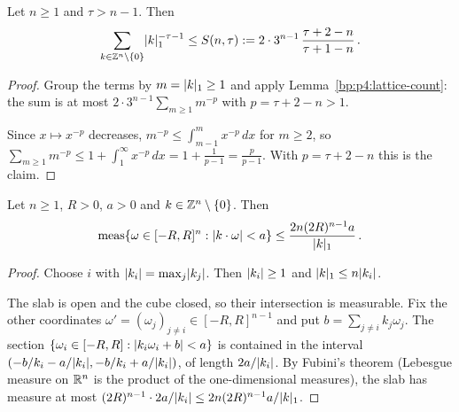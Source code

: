 \begin{lemma}\label{bp:p4:lattice-sum}
Let $n\ge1$ and $\tau>n-1$. Then
\begin{equation*}
\sum_{k\in\mathbb{Z}^n\setminus\{0\}}\lvert k\rvert_1^{-\tau-1}\le S(n,\tau):=2\cdot3^{n-1}\,\frac{\tau+2-n}{\tau+1-n}\,.
\end{equation*}
\end{lemma}

\begin{proof}
\label{step:p4:latsum-shells}
Group the terms by $m=\lvert k\rvert_1\ge1$ and apply Lemma~\ref{bp:p4:lattice-count}: the sum is at
most $2\cdot3^{n-1}\sum_{m\ge1}m^{-p}$ with $p=\tau+2-n>1$.

\label{step:p4:latsum-integral}
Since $x\mapsto x^{-p}$ decreases, $m^{-p}\le\int_{m-1}^mx^{-p}\,dx$ for $m\ge2$, so
$\sum_{m\ge1}m^{-p}\le1+\int_1^\infty x^{-p}\,dx=1+\frac1{p-1}=\frac{p}{p-1}$. With
$p=\tau+2-n$ this is the claim.
\end{proof}

\begin{lemma}\label{bp:p4:slab}
Let $n\ge1$, $R>0$, $a>0$ and $k\in\mathbb{Z}^n\setminus\{0\}$. Then
\begin{equation*}
\operatorname{meas}\{\omega\in[-R,R]^n:\lvert k\cdot\omega\rvert<a\}\le\frac{2n(2R)^{n-1}a}{\lvert k\rvert_1}\,.
\end{equation*}
\end{lemma}

\begin{proof}
\label{step:p4:slab-coordinate}
Choose $i$ with $\lvert k_i\rvert=\max_j\lvert k_j\rvert$. Then $\lvert k_i\rvert\ge1$ and $\lvert k\rvert_1\le n\lvert k_i\rvert$.

\label{step:p4:slab-fubini}
The slab is open and the cube closed, so their intersection is measurable. Fix the other coordinates
$\omega'=(\omega_j)_{j\ne i}\in[-R,R]^{n-1}$ and put $b=\sum_{j\ne i}k_j\omega_j$. The section
$\{\omega_i\in[-R,R]:\lvert k_i\omega_i+b\rvert<a\}$ is contained in the interval
$(-b/k_i-a/\lvert k_i\rvert,-b/k_i+a/\lvert k_i\rvert)$, of length $2a/\lvert k_i\rvert$. By Fubini's theorem (Lebesgue
measure on $\mathbb{R}^n$ is the product of the one-dimensional measures), the slab has measure at most
$(2R)^{n-1}\cdot2a/\lvert k_i\rvert\le2n(2R)^{n-1}a/\lvert k\rvert_1$.
\end{proof}

